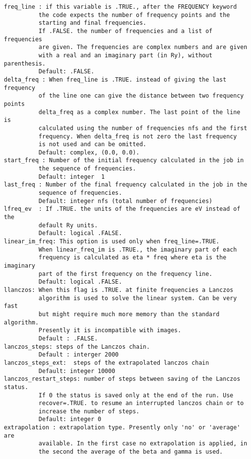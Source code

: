 \documentclass[12pt,a4paper]{article}
\begin{document}
\begin{verbatim}
freq_line : if this variable is .TRUE., after the FREQUENCY keyword
          the code expects the number of frequency points and the 
          starting and final frequencies. 
          If .FALSE. the number of frequencies and a list of frequencies 
          are given. The frequencies are complex numbers and are given 
          with a real and an imaginary part (in Ry), without parenthesis.
          Default: .FALSE.
delta_freq : When freq_line is .TRUE. instead of giving the last frequency 
          of the line one can give the distance between two frequency points
          delta_freq as a complex number. The last point of the line is 
          calculated using the number of frequencies nfs and the first 
          frequency. When delta_freq is not zero the last frequency 
          is not used and can be omitted.
          Default: complex, (0.0, 0.0).
start_freq : Number of the initial frequency calculated in the job in
          the sequence of frequencies.
          Default: integer  1
last_freq : Number of the final frequency calculated in the job in the
          sequence of frequencies.
          Default: integer nfs (total number of frequencies)
lfreq_ev  : If .TRUE. the units of the frequencies are eV instead of the
          default Ry units.
          Default: logical .FALSE.
linear_im_freq: This option is used only when freq_line=.TRUE. 
          When linear_freq_im is .TRUE., the imaginary part of each 
          frequency is calculated as eta * freq where eta is the imaginary 
          part of the first frequency on the frequency line.
          Default: logical .FALSE.
llanczos: When this flag is .TRUE. at finite frequencies a Lanczos 
          algorithm is used to solve the linear system. Can be very fast 
          but might require much more memory than the standard algorithm.
          Presently it is incompatible with images.
          Default : .FALSE.
lanczos_steps: steps of the Lanczos chain.
          Default : interger 2000
lanczos_steps_ext:  steps of the extrapolated lanczos chain
          Default: integer 10000
lanczos_restart_steps: number of steps between saving of the Lanczos status.
          If 0 the status is saved only at the end of the run. Use 
          recover=.TRUE. to resume an interrupted lanczos chain or to
          increase the number of steps.
          Default: integer 0
extrapolation : extrapolation type. Presently only 'no' or 'average' are
          available. In the first case no extrapolation is applied, in
          the second the average of the beta and gamma is used.

\end{verbatim}
\end{document}
